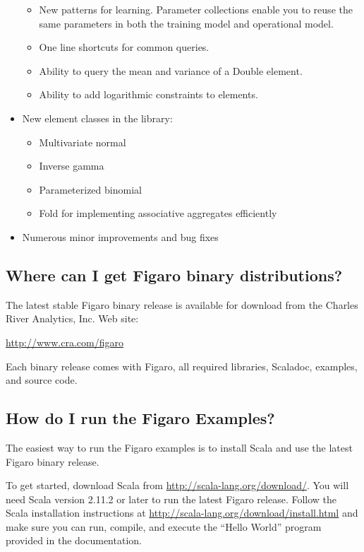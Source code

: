 \documentclass[]{article}
\begin{document}
\begin{itemize}
  \begin{itemize}
  \item
    New patterns for learning. Parameter collections enable you to reuse
    the same parameters in both the training model and operational
    model.
  \item
    One line shortcuts for common queries.
  \item
    Ability to query the mean and variance of a Double element.
  \item
    Ability to add logarithmic constraints to elements.
  \end{itemize}
\item
  New element classes in the library:

  \begin{itemize}
  \item
    Multivariate normal
  \item
    Inverse gamma
  \item
    Parameterized binomial
  \item
    Fold for implementing associative aggregates efficiently
  \end{itemize}
\item
  Numerous minor improvements and bug fixes
\end{itemize}

\subsection{Where can I get Figaro binary
distributions?}\label{where-can-i-get-figaro-binary-distributions}

The latest stable Figaro binary release is available for download from
the Charles River Analytics, Inc. Web site:

\url{http://www.cra.com/figaro}

Each binary release comes with Figaro, all required libraries, Scaladoc,
examples, and source code.

\subsection{How do I run the Figaro
Examples?}\label{how-do-i-run-the-figaro-examples}

The easiest way to run the Figaro examples is to install Scala and use
the latest Figaro binary release.

To get started, download Scala from
\url{http://scala-lang.org/download/}. You will need Scala version
2.11.2 or later to run the latest Figaro release. Follow the Scala
installation instructions at
\url{http://scala-lang.org/download/install.html} and make sure you can
run, compile, and execute the ``Hello World'' program provided in the
documentation.
\end{document}
